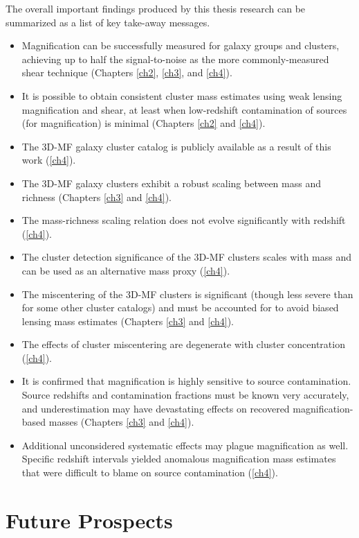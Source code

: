 The overall important findings produced by this thesis research can be summarized as a list of key take-away messages.
\begin{itemize}
\item Magnification can be successfully measured for galaxy groups and clusters, achieving up to half the signal-to-noise as the more commonly-measured shear technique (Chapters \ref{ch2}, \ref{ch3}, and \ref{ch4}).
\item It is possible to obtain consistent cluster mass estimates using weak lensing magnification and shear, at least when low-redshift contamination of sources (for magnification) is minimal (Chapters \ref{ch2} and \ref{ch4}).
\item The \ac{3D-MF} galaxy cluster catalog is publicly available as a result of this work (\autoref{ch4}).
\item The \ac{3D-MF} galaxy clusters exhibit a robust scaling between mass and richness (Chapters \ref{ch3} and \ref{ch4}).
\item The mass-richness scaling relation does not evolve significantly with redshift (\autoref{ch4}).
\item The cluster detection significance of the \ac{3D-MF} clusters scales with mass and can be used as an alternative mass proxy (\autoref{ch4}).
\item The miscentering of the \ac{3D-MF} clusters is significant (though less severe than for some other cluster catalogs) and must be accounted for to avoid biased lensing mass estimates (Chapters \ref{ch3} and \ref{ch4}).
\item The effects of cluster miscentering are degenerate with cluster concentration (\autoref{ch4}).
\item It is confirmed that magnification is highly sensitive to source contamination. Source redshifts and contamination fractions must be known very accurately, and underestimation may have devastating effects on recovered magnification-based masses (Chapters \ref{ch3} and \ref{ch4}).
\item Additional unconsidered systematic effects may plague magnification as well. Specific redshift intervals yielded anomalous magnification mass estimates that were difficult to blame on source contamination (\autoref{ch4}).
\end{itemize}

\section{Future Prospects}
\label{sec:future}

